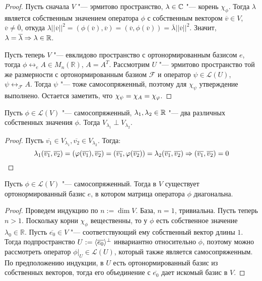 \begin{proof}
	Пусть сначала $V$ "--- эрмитово пространство, $\lambda \in \Cm$ "--- корень $\chi_\phi$. Тогда $\lambda$ является собственным значением оператора $\phi$ с собственным вектором $\overline{v} \in V$, $\overline{v} \ne \overline{0}$, откуда $\lambda||\overline{v}||^2 = (\phi(\overline{v}), \overline{v}) = (\overline{v}, \phi(\overline{v})) = \overline{\lambda}||\overline{v}||^2$. Значит, $\lambda = \overline\lambda \ra \lambda \in \R$.
	
	Пусть теперь $V$ "--- евклидово пространство с ортонормированным базисом $e$, тогда $\phi \leftrightarrow_e A \in M_n(\mathbb{R})$, $A = A^T$. Рассмотрим $U$ "--- эрмитово пространство той же размерности с ортонормированным базиом $\mathcal{F}$ и оператор $\psi \in \mathcal{L}(U)$, $\psi \leftrightarrow_{\mathcal{F}} A$. Тогда $\psi$ "--- тоже самосопряженный, поэтому для $\chi_\psi$ утверждение выполнено. Остается заметить, что $\chi_\psi \hm{=} \chi_A = \chi_\phi$.
\end{proof}

\begin{proposition}
	Пусть $\phi \in \mathcal{L}(V)$ "--- самосопряженный, $\lambda_1, \lambda_2 \hm{\in} \mathbb{R}$ "--- два различных собственных значения $\phi$. Тогда $V_{\lambda_1} \perp V_{\lambda_2}$.
\end{proposition}

\begin{proof}
	Пусть $\overline{v_1} \in V_{\lambda_1}, \overline{v_2} \in V_{\lambda_2}$. Тогда:
	\[\lambda_1(\overline{v_1}, \overline{v_2}) = (\phi(\overline{v_1}), \overline{v_2}) = (\overline{v_1}, \phi(\overline{v_2})) = \lambda_2(\overline{v_1}, \overline{v_2}) \Rightarrow (\overline{v_1}, \overline{v_2}) = 0\qedhere\]
\end{proof}

\begin{theorem}
	Пусть $\phi \in \mathcal{L}(V)$ "--- самосопряженный. Тогда в $V$ существует ортонормированный базис $e$, в котором матрица оператора $\phi$ диагональна.
\end{theorem}

\begin{proof}
	Проведем индукцию по $n := \dim{V}$. База, $n = 1$, тривиальна. Пусть теперь $n > 1$. Поскольку корни $\chi_\phi$ вещественны, то у $\phi$ есть собственное значение $\lambda_0 \in \mathbb{R}$. Пусть $\overline{e_0} \in V$ "--- соответствующий ему собственный вектор длины $1$. Тогда подпространство $U \hm{:=} \langle\overline{e_0}\rangle^\perp$ инвариантно относительно $\phi$, поэтому можно рассмотреть оператор $\phi|_{U} \in \mathcal{L}(U)$, который также является самосопряженным. По предположению индукции, в $U$ есть ортонормированный базис из собственных векторов, тогда его объединение с $\overline{e_0}$ дает искомый базис в $V$.
\end{proof}

